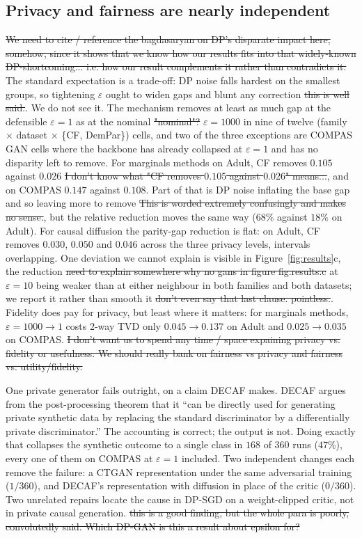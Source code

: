 \documentclass{article}
\begin{document}
{{\subsection{Privacy and fairness are nearly independent}

\st{We need to cite / reference the bagdasaryan on DP's disparate impact here, somehow, since it shows that we know how our results fits into that widely-known DP-shortcoming... i.e. how our result complements it rather than contradicts it.}
The standard expectation is a trade-off: DP noise falls hardest on the smallest
groups, so tightening $\varepsilon$ ought to widen gaps and blunt any correction \st{this is well said.}.
We do not see it. The mechanism removes at least as much gap at the defensible
$\varepsilon{=}1$ as at the nominal \st{"nominal"?} $\varepsilon{=}1000$ in nine of twelve
(family $\times$ dataset $\times$ \{CF, DemPar\}) cells, and two of the three
exceptions are COMPAS GAN cells where the backbone has already collapsed at
$\varepsilon{=}1$ and has no disparity left to remove. For marginals methods on
Adult, CF removes $0.105$ against $0.026$ \st{I don't know what "CF removes $0.105$ against $0.026$" means...}, and on COMPAS $0.147$ against $0.108$.
Part of that is DP noise inflating the base gap and so leaving more to remove \st{This is worded extremely confusingly and makes no sense.}, but
the relative reduction moves the same way ($68\%$ against $18\%$ on Adult). For
causal diffusion the parity-gap reduction is flat: on Adult, CF removes $0.030$,
$0.050$ and $0.046$ across the three privacy levels, intervals overlapping. One
deviation we cannot explain is visible in Figure~\ref{fig:results}c, the reduction \st{need to explain somewhere why no gans in figure fig:results.c}
at $\varepsilon{=}10$
being weaker than at either neighbour in both families and both datasets; we
report it rather than smooth it \st{don't even say that last clause. pointless.}. Fidelity does pay for privacy, but least where
it matters: for marginals methods, $\varepsilon{=}1000 \rightarrow 1$ costs 2-way TVD
only $0.045 \rightarrow 0.137$ on Adult and $0.025 \rightarrow 0.035$ on COMPAS. \st{I don't want us to spend any time / space expaining privacy vs. fidelity or usefulness. We should really bank on fairness vs privacy and fairness vs. utility/fidelity.}

One private generator fails outright, on a claim DECAF makes. DECAF argues from
the post-processing theorem that it ``can be directly used for generating private
synthetic data by replacing the standard discriminator by a differentially private
discriminator.'' The accounting is correct; the output is not. Doing exactly that
collapses the synthetic outcome to a single class in $168$ of $360$ runs ($47\%$),
every one of them on COMPAS at $\varepsilon{=}1$ included. Two independent changes
each remove the failure: a CTGAN representation under the same adversarial
training ($1/360$), and DECAF's representation with diffusion in place of the
critic ($0/360$). Two unrelated repairs locate the cause in DP-SGD on a
weight-clipped critic, not in private causal generation. \st{this is a good finding, but the whole para is poorly, convolutedly said. Which DP-GAN is this a result about epsilon for?}

}}
\end{document}
